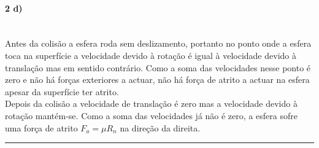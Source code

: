 \paragraph{2 d)} ~\\
Antes da colisão a esfera roda sem deslizamento, portanto no ponto onde a esfera toca na superfície a velocidade devido à rotação é igual à velocidade devido à translação mas em sentido contrário. Como a soma das velocidades nesse ponto é zero e não há forças exteriores a actuar, não há força de atrito a actuar na esfera apesar da superfície ter atrito.\\
Depois da colisão a velocidade de translação é zero mas a velocidade devido à rotação mantém-se. Como a soma das velocidades já não é zero, a esfera sofre uma força de atrito $F_a=\mu R_n$ na direção da direita.\\

\hrule
